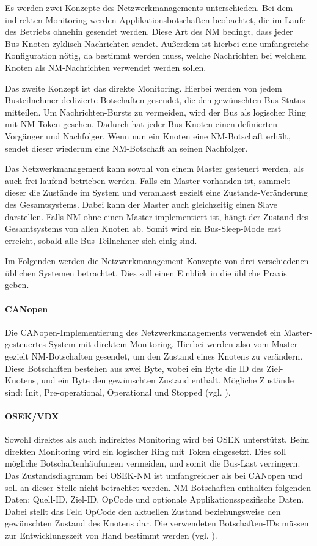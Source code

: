 \documentclass[
  a4paper,					    %
  twoside,
  DIV=calc,     				%
  bibliography=totoc,
  cleardoublepage=empty,
  ngerman,     					%
  final       					%
]{scrbook}
\begin{document}
Es werden zwei Konzepte des Netzwerkmanagements unterschieden. Bei dem indirekten Monitoring werden Applikationsbotschaften beobachtet, die im Laufe des Betriebs ohnehin gesendet werden. Diese Art des NM bedingt, dass jeder Bus-Knoten zyklisch Nachrichten sendet. Außerdem ist hierbei eine umfangreiche Konfiguration nötig, da bestimmt werden muss, welche Nachrichten bei welchem Knoten als NM-Nachrichten verwendet werden sollen.

Das zweite Konzept ist das direkte Monitoring. Hierbei werden von jedem Busteilnehmer dedizierte Botschaften gesendet, die den gewünschten Bus-Sta\-tus mitteilen. Um Nachrichten-Bursts zu vermeiden, wird der Bus als logischer Ring mit NM-Token gesehen. Dadurch hat jeder Bus-Knoten einen definierten Vorgänger und Nachfolger. Wenn nun ein Knoten eine NM-Botschaft erhält, sendet dieser wiederum eine NM-Botschaft an seinen Nachfolger.

Das Netzwerkmanagement kann sowohl von einem Master gesteuert werden, als auch frei laufend betrieben werden. Falls ein Master vorhanden ist, sammelt dieser die Zustände im System und veranlasst gezielt eine Zu\-stands-Ver\-än\-de\-rung des Gesamtsystems. Dabei kann der Master auch gleichzeitig einen Slave darstellen. Falls NM ohne einen Master implementiert ist, hängt der Zustand des Gesamtsystems von allen Knoten ab. Somit wird ein Bus-Sleep-Mode erst erreicht, sobald alle Bus-Teilnehmer sich einig sind.

Im Folgenden werden die Netzwerkmanagement-Konzepte von drei verschiedenen üblichen Systemen betrachtet. Dies soll einen Einblick in die übliche Praxis geben.

\paragraph{CANopen}
Die CANopen-Implementierung des Netzwerkmanagements verwendet ein Master-gesteuertes System mit direktem Monitoring. Hierbei werden also vom Master gezielt NM-Botschaften gesendet, um den Zustand eines Knotens zu verändern. Diese Botschaften bestehen aus zwei Byte, wobei ein Byte die ID des Ziel-Knotens, und ein Byte den gewünschten Zustand enthält. Mögliche Zustände sind: Init, Pre-operational, Operational und Stopped (vgl. \cite{nm_canopen}\cite{wiki:canopen}).

\paragraph{OSEK/VDX}
Sowohl direktes als auch indirektes Monitoring wird bei OSEK unterstützt. Beim direkten Monitoring wird ein logischer Ring mit Token eingesetzt. Dies soll mögliche Botschaftenhäufungen vermeiden, und somit die Bus-Last verringern. Das Zustandsdiagramm bei OSEK-NM ist umfangreicher als bei CANopen und soll an dieser Stelle nicht betrachtet werden. NM-Botschaften enthalten folgenden Daten: Quell-ID, Ziel-ID, OpCode und optionale Applikationsspezifische Daten. Dabei stellt das Feld OpCode den aktuellen Zustand beziehungsweise den gewünschten Zustand des Knotens dar. Die verwendeten Botschaften-IDs müssen zur Entwicklungszeit von Hand bestimmt werden (vgl. \cite{nm_osek}\cite{ZimmermannSchmidgall201011}).
\end{document}
